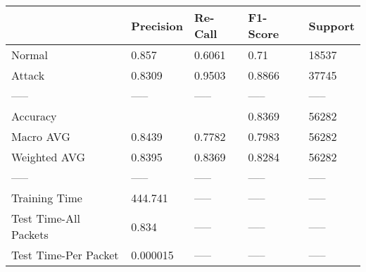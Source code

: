 \begin{tabular}{lllll}
\toprule
{} & Precision & Re-Call & F1-Score & Support \\
\midrule
Normal                &     0.857 &  0.6061 &     0.71 &   18537 \\
Attack                &    0.8309 &  0.9503 &   0.8866 &   37745 \\
-----                 &     ----- &   ----- &    ----- &   ----- \\
Accuracy              &           &         &   0.8369 &   56282 \\
Macro AVG             &    0.8439 &  0.7782 &   0.7983 &   56282 \\
Weighted AVG          &    0.8395 &  0.8369 &   0.8284 &   56282 \\
-----                 &     ----- &   ----- &    ----- &   ----- \\
Training Time         &   444.741 &   ----- &    ----- &   ----- \\
Test Time-All Packets &     0.834 &   ----- &    ----- &   ----- \\
Test Time-Per Packet  &  0.000015 &   ----- &    ----- &   ----- \\
\bottomrule
\end{tabular}
